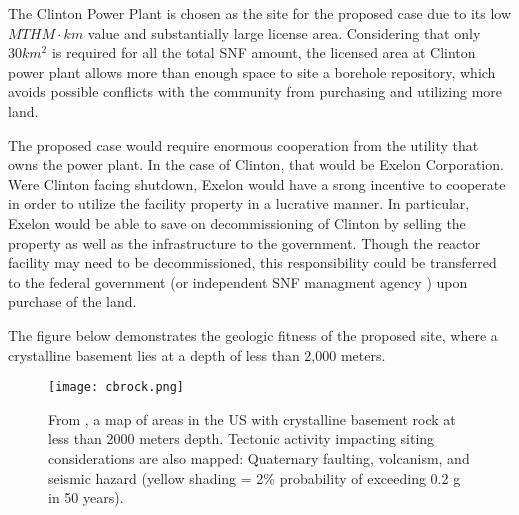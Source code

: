 
The Clinton Power Plant is chosen as the site for the proposed case due to its
        low $MTHM\cdot km$ value and substantially large license 
        area\cite{nrc_chapter_2007}.
 Considering that only
 $30km^2$ is required for all the total \gls{SNF} amount, the licensed area at Clinton
  power plant allows more than  enough space to site a borehole repository, which
   avoids possible conflicts with the community from purchasing and utilizing more
    land. 
  
  The proposed case would require enormous cooperation from the utility that owns
  the power plant. In the case of Clinton, that would be Exelon Corporation. 
  Were Clinton facing shutdown, Exelon would have a srong incentive to 
        cooperate in order to utilize the facility property
  in a lucrative manner. In particular, Exelon would be able to save on decommissioning of
  Clinton by selling the property as well as the infrastructure to the 
        government. Though the reactor facility may need to be decommissioned, 
        this responsibility could be transferred to the federal government (or 
        independent \gls{SNF} managment agency \cite{ayers_blue_2012}) upon 
        purchase of the land.
  
  
  
  The figure below demonstrates the geologic fitness of the proposed site, where 
  a crystalline basement lies at a depth of less than 2,000 meters.



\begin{figure}[!h] 
  \centering
  \texttt{[image: cbrock.png]}	
        \caption{From \cite{perry_gis_2015}, a map of areas in the US with 
        crystalline basement rock at less than 2000 meters depth. Tectonic 
        activity impacting siting considerations are also mapped:  Quaternary 
        faulting, volcanism, and seismic hazard (yellow shading = 2\% 
        probability of exceeding 0.2 g in 50 years).}
  \label{fig:cbrock}
\end{figure}

  
  \iffalse

